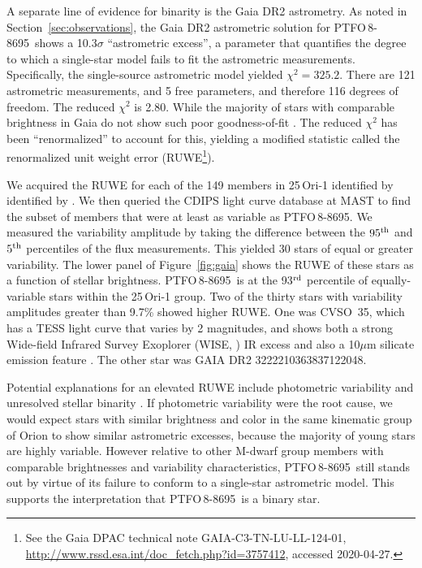 \documentclass[12pt,twocolumn,tighten]{aastex62}
\newcommand{\ptfo}{PTFO$\,$8-8695}
\begin{document}
A separate line of evidence for binarity is the Gaia DR2 astrometry.
As noted in Section~\ref{sec:observations}, the Gaia DR2 astrometric
solution for \ptfo\ shows a 10.3$\sigma$ ``astrometric excess'', a
parameter that quantifies the degree to which a single-star model
fails to fit the astrometric measurements.  Specifically, the
single-source astrometric model yielded $\chi^2=325.2$.  There are 121
astrometric measurements, and 5 free parameters, and therefore 116
degrees of freedom. The reduced $\chi^2$ is 2.80.  While the majority
of stars with comparable brightness in Gaia do not show such poor
goodness-of-fit \citep[see][Appendix
A]{lindegren_gaiasoln_2018}.  The reduced $\chi^2$ has been
``renormalized'' to account for this, yielding a modified statistic
called the renormalized unit weight error (RUWE\footnote{ See the Gaia
DPAC technical note GAIA-C3-TN-LU-LL-124-01,
\url{http://www.rssd.esa.int/doc_fetch.php?id=3757412}, accessed
2020-04-27. }).

We acquired the RUWE for each of the 149 members in 25$\,$Ori-1
identified by identified by \citet{kounkel_apogee2_2018}.  We then
queried the CDIPS light curve database at MAST
\citep{bouma_cluster_2019} to find the subset of members that were at
least as variable as \ptfo.  We measured the variability amplitude by
taking the difference between the $95^{\rm th}$ and $5^{\rm th}$
percentiles of the flux measurements.  This yielded 30 stars of equal
or greater variability.  The lower panel of Figure~\ref{fig:gaia}
shows the RUWE of these stars as a function of stellar brightness.
\ptfo\ is at the 93$^{\rm rd}$ percentile of equally-variable stars
within the 25$\,$Ori-1 group.  Two of the thirty stars with
variability amplitudes greater than 9.7\% showed higher RUWE.  One was
CVSO~35, which has a TESS light curve that varies by 2 magnitudes, and
shows both a strong Wide-field Infrared Survey Exoplorer (WISE,
\citealt{wright_WISE_2010}) IR excess and also a 10$\mu$m silicate
emission feature \citep{mauco_herschel_2018}.  The other star was GAIA
DR2 3222210363837122048.

Potential explanations for an elevated RUWE include photometric
variability and unresolved stellar binarity \citep[{\it
e.g.},][]{rizzuto_ZEIT8_2018,belokurov_unresolved_2020}.  If
photometric variability were the root cause, we would expect stars
with similar brightness and color in the same kinematic group of Orion
to show similar astrometric excesses, because the majority of young
stars are highly variable.  However relative to other M-dwarf group
members with comparable brightnesses and variability characteristics,
\ptfo\ still stands out by virtue of its failure to conform to a
single-star astrometric model. This supports the interpretation that
\ptfo\ is a binary star.
\end{document}

